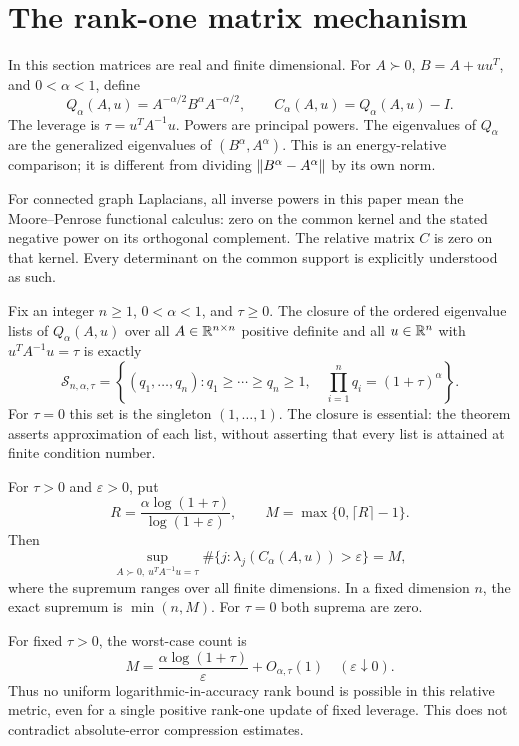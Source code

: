 \section{The rank-one matrix mechanism}\label{mat:sec:matrix}
In this section matrices are real and finite dimensional. For $A\succ0$,
$B=A+uu^T$, and $0<\alpha<1$, define
\[
 Q_\alpha(A,u)=A^{-\alpha/2}B^\alpha A^{-\alpha/2},\qquad
 C_\alpha(A,u)=Q_\alpha(A,u)-I.
\]
The leverage is $\tau=u^TA^{-1}u$. Powers are principal powers.
The eigenvalues of $Q_\alpha$ are the generalized eigenvalues of
$(B^\alpha,A^\alpha)$. This is an energy-relative comparison; it is
different from dividing $\left\lVert B^\alpha-A^\alpha\right\rVert$ by its own norm.

For connected graph Laplacians, all inverse powers in this paper mean
the Moore--Penrose functional calculus: zero on the common kernel and
the stated negative power on its orthogonal complement. The relative
matrix $C$ is zero on that kernel. Every determinant on the common
support is explicitly understood as such.

\begin{theorem}
\label{mat:thm:closure}
Fix an integer $n\ge1$, $0<\alpha<1$, and $\tau\ge0$.
The closure of the ordered eigenvalue lists of
$Q_\alpha(A,u)$ over all $A\in\mathbb R^{n\times n}$ positive definite and
all $u\in\mathbb R^n$ with $u^TA^{-1}u=\tau$ is exactly
\[
 \mathcal S_{n,\alpha,\tau}
 =\left\{(q_1,\ldots,q_n):
       q_1\ge\cdots\ge q_n\ge1,\quad
       \prod_{i=1}^nq_i=(1+\tau)^\alpha\right\}.
\]
For $\tau=0$ this set is the singleton $(1,\ldots,1)$.
The closure is essential: the theorem asserts approximation of each
list, without asserting that every list is attained at finite condition
number.
\end{theorem}

\begin{corollary}\label{mat:cor:count}
For $\tau>0$ and $\varepsilon>0$, put
\[
 R=\frac{\alpha\log(1+\tau)}{\log(1+\varepsilon)},\qquad
 M=\max\{0,\lceil R\rceil-1\}.
\]
Then
\[
 \sup_{A\succ0,\ u^TA^{-1}u=\tau}
 \#\{j:\lambda_j(C_\alpha(A,u))>\varepsilon\}=M,
\]
where the supremum ranges over all finite dimensions.
In a fixed dimension $n$, the exact supremum is $\min(n,M)$.
For $\tau=0$ both suprema are zero.
\end{corollary}

For fixed $\tau>0$, the worst-case count is
\[
 M=\frac{\alpha\log(1+\tau)}{\varepsilon}+O_{\alpha,\tau}(1)
 \quad(\varepsilon\downarrow0).
\]
Thus no uniform logarithmic-in-accuracy rank bound is possible in this
relative metric, even for a single positive rank-one update of fixed
leverage. This does not contradict absolute-error compression estimates.

